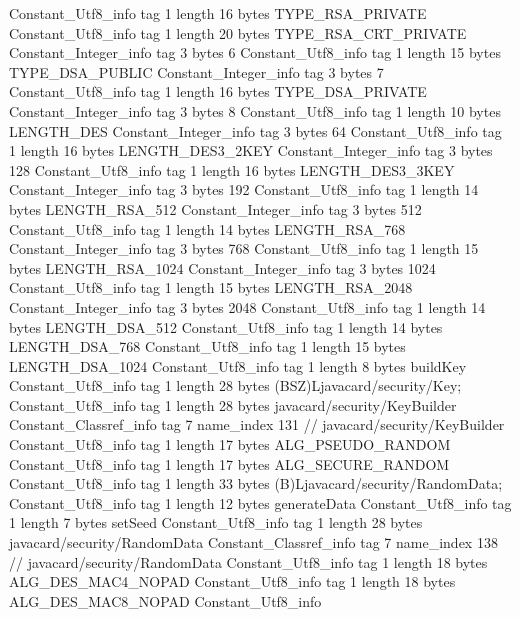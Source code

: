{{		Constant_Utf8_info {
			tag	1
			length	16
			bytes	TYPE_RSA_PRIVATE
		}
		Constant_Utf8_info {
			tag	1
			length	20
			bytes	TYPE_RSA_CRT_PRIVATE
		}
		Constant_Integer_info {
			tag	3
			bytes	6
		}
		Constant_Utf8_info {
			tag	1
			length	15
			bytes	TYPE_DSA_PUBLIC
		}
		Constant_Integer_info {
			tag	3
			bytes	7
		}
		Constant_Utf8_info {
			tag	1
			length	16
			bytes	TYPE_DSA_PRIVATE
		}
		Constant_Integer_info {
			tag	3
			bytes	8
		}
		Constant_Utf8_info {
			tag	1
			length	10
			bytes	LENGTH_DES
		}
		Constant_Integer_info {
			tag	3
			bytes	64
		}
		Constant_Utf8_info {
			tag	1
			length	16
			bytes	LENGTH_DES3_2KEY
		}
		Constant_Integer_info {
			tag	3
			bytes	128
		}
		Constant_Utf8_info {
			tag	1
			length	16
			bytes	LENGTH_DES3_3KEY
		}
		Constant_Integer_info {
			tag	3
			bytes	192
		}
		Constant_Utf8_info {
			tag	1
			length	14
			bytes	LENGTH_RSA_512
		}
		Constant_Integer_info {
			tag	3
			bytes	512
		}
		Constant_Utf8_info {
			tag	1
			length	14
			bytes	LENGTH_RSA_768
		}
		Constant_Integer_info {
			tag	3
			bytes	768
		}
		Constant_Utf8_info {
			tag	1
			length	15
			bytes	LENGTH_RSA_1024
		}
		Constant_Integer_info {
			tag	3
			bytes	1024
		}
		Constant_Utf8_info {
			tag	1
			length	15
			bytes	LENGTH_RSA_2048
		}
		Constant_Integer_info {
			tag	3
			bytes	2048
		}
		Constant_Utf8_info {
			tag	1
			length	14
			bytes	LENGTH_DSA_512
		}
		Constant_Utf8_info {
			tag	1
			length	14
			bytes	LENGTH_DSA_768
		}
		Constant_Utf8_info {
			tag	1
			length	15
			bytes	LENGTH_DSA_1024
		}
		Constant_Utf8_info {
			tag	1
			length	8
			bytes	buildKey
		}
		Constant_Utf8_info {
			tag	1
			length	28
			bytes	(BSZ)Ljavacard/security/Key;
		}
		Constant_Utf8_info {
			tag	1
			length	28
			bytes	javacard/security/KeyBuilder
		}
		Constant_Classref_info {
			tag	7
			name_index	131		// javacard/security/KeyBuilder
		}
		Constant_Utf8_info {
			tag	1
			length	17
			bytes	ALG_PSEUDO_RANDOM
		}
		Constant_Utf8_info {
			tag	1
			length	17
			bytes	ALG_SECURE_RANDOM
		}
		Constant_Utf8_info {
			tag	1
			length	33
			bytes	(B)Ljavacard/security/RandomData;
		}
		Constant_Utf8_info {
			tag	1
			length	12
			bytes	generateData
		}
		Constant_Utf8_info {
			tag	1
			length	7
			bytes	setSeed
		}
		Constant_Utf8_info {
			tag	1
			length	28
			bytes	javacard/security/RandomData
		}
		Constant_Classref_info {
			tag	7
			name_index	138		// javacard/security/RandomData
		}
		Constant_Utf8_info {
			tag	1
			length	18
			bytes	ALG_DES_MAC4_NOPAD
		}
		Constant_Utf8_info {
			tag	1
			length	18
			bytes	ALG_DES_MAC8_NOPAD
		}
		Constant_Utf8_info {
}}}
